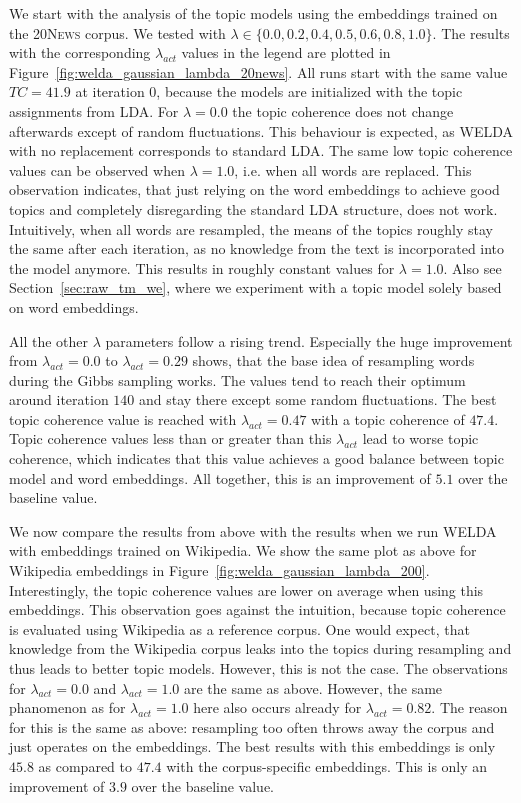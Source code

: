 \documentclass[
        a4paper,
        titlepage,
        twoside,
        parskip,
        numbers=noenddot
        ]{scrbook}
\theoremstyle{break}
\begin{document}
We start with the analysis of the topic models using the embeddings trained on the \textsc{20News} corpus.
We tested with $\lambda \in \{ 0.0, 0.2, 0.4, 0.5, 0.6, 0.8, 1.0 \}$.
The results with the corresponding $\lambda_{act}$ values in the legend are plotted in Figure~\ref{fig:welda_gaussian_lambda_20news}.
All runs start with the same value $TC = 41.9$ at iteration 0, because the models are initialized with the topic assignments from LDA.
For $\lambda = 0.0$ the topic coherence does not change afterwards except of random fluctuations.
This behaviour is expected, as WELDA with no replacement corresponds to standard LDA.
The same low topic coherence values can be observed when $\lambda = 1.0$, i.e. when all words are replaced.
This observation indicates, that just relying on the word embeddings to achieve good topics and completely disregarding the standard LDA structure, does not work.
Intuitively, when all words are resampled, the means of the topics roughly stay the same after each iteration, as no knowledge from the text is incorporated into the model anymore.
This results in roughly constant values for $\lambda = 1.0$.
Also see Section~\ref{sec:raw_tm_we}, where we experiment with a topic model solely based on word embeddings.

All the other $\lambda$ parameters follow a rising trend.
Especially the huge improvement from $\lambda_{act} = 0.0$ to $\lambda_{act} = 0.29$ shows, that the base idea of resampling words during the Gibbs sampling works.
The values tend to reach their optimum around iteration $140$ and stay there except some random fluctuations.
The best topic coherence value is reached with $\lambda_{act} = 0.47$ with a topic coherence of $47.4$.
Topic coherence values less than or greater than this $\lambda_{act}$ lead to worse topic coherence, which indicates that this value achieves a good balance between topic model and word embeddings.
All together, this is an improvement of $5.1$ over the baseline value.

We now compare the results from above with the results when we run WELDA with embeddings trained on Wikipedia.
We show the same plot as above for Wikipedia embeddings in Figure~\ref{fig:welda_gaussian_lambda_200}.
Interestingly, the topic coherence values are lower on average when using this embeddings.
This observation goes against the intuition, because topic coherence is evaluated using Wikipedia as a reference corpus.
One would expect, that knowledge from the Wikipedia corpus leaks into the topics during resampling and thus leads to better topic models.
However, this is not the case.
The observations for $\lambda_{act} = 0.0$ and $\lambda_{act} = 1.0$ are the same as above.
However, the same phanomenon as for $\lambda_{act} = 1.0$ here also occurs already for $\lambda_{act} = 0.82$.
The reason for this is the same as above: resampling too often throws away the corpus and just operates on the embeddings.
The best results with this embeddings is only $45.8$ as compared to $47.4$ with the corpus-specific embeddings.
This is only an improvement of $3.9$ over the baseline value.
\end{document}
